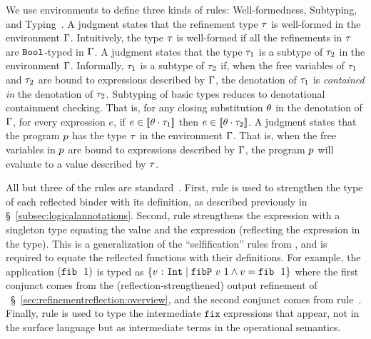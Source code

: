 We use environments to define three kinds of
rules: Well-formedness, Subtyping,
and Typing~\citep{Knowles10,Vazou14}.
%
A judgment \iswellformed{\env}{\typ} states that
the refinement type $\tau$ is well-formed in
the environment $\Gamma$.
%
Intuitively, the type $\tau$ is well-formed if all
the refinements in $\tau$ are $\mathtt{Bool}$-typed in $\Gamma$.
%
A judgment  states
that the type $\tau_1$ is a subtype of %
$\tau_2$ in the environment $\Gamma$.
%
Informally, $\tau_1$ is a subtype of $\tau_2$ if, when
the free variables of $\tau_1$ and $\tau_2$
are bound to expressions described by $\Gamma$,
the denotation of $\tau_1$
is \emph{contained in} the denotation of $\tau_2$.
%
Subtyping of basic types reduces to denotational containment checking.
%
%
That is, for any closing substitution $\theta$
in the denotation of $\Gamma$, for every expression $e$,
if $e \in \interp{\applysub{\sto}{\typ_1}}$ then
$ e \in \interp{\applysub{\sto}{\typ_2}}$.
%
A judgment \hastype{\env}{\prog}{\typ} states that
the program $p$ has the type $\tau$ in
the environment $\Gamma$.
That is, when the free variables in $p$ are
bound to expressions described by $\Gamma$, the
program $p$ will evaluate to a value
described by $\tau$.

%
All but three of the rules are standard~\cite{Knowles10,Vazou14}.
%
First, rule \rtreflect is used to strengthen the type of each
reflected binder with its definition, as described previously
in \S~\ref{subsec:logicalannotations}.
%
Second, rule \rtexact strengthens the expression with
a singleton type equating the value and the expression
(\ie reflecting the expression in the type).
%
This is a generalization of the ``selfification'' rules
from \cite{Ou2004,Knowles10}, and is required to
equate the reflected functions with their definitions.
%
For example, the application $(\texttt{fib}\ {\ }1)$ is typed as
${\{ {v} \ \text{:}\ {\mathtt{Int}} \mid \texttt{fibP}\ v\ 1 \wedge v = \texttt{fib}\ {\ }1 \}}$ where
the first conjunct comes from the (reflection-strengthened)
output refinement of \fib~\S~\ref{sec:refinementreflection:overview}, and
the second conjunct comes from rule~\rtexact.
%
Finally, rule \rtfix is used to type the intermediate
$\texttt{fix}$ expressions that appear, not in the
surface language but as intermediate terms in the
operational semantics.

